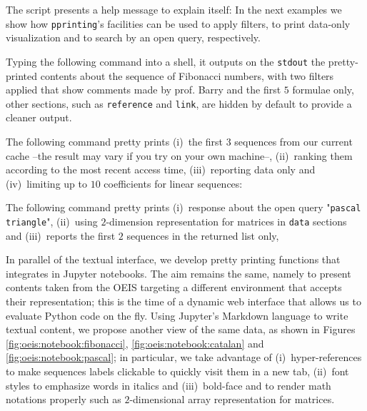 The script presents a help message to explain itself:
 In the next examples
we show how \verb|pprinting|'s facilities can be used to apply filters, to
print data-only visualization and to search by an open query, respectively.

\begin{example} Typing the following command into a shell, it outputs
on the \verb|stdout| the pretty-printed contents about the sequence of
Fibonacci numbers, with two filters applied that show comments made by
prof. Barry and the first $5$ formulae only,
other sections, such as \verb|reference| and \verb|link|, are hidden by
default to provide a cleaner output.
\end{example}

\begin{example}
The following command pretty prints (i)~the first 3 sequences from our current
cache --the result may vary if you try on your own machine--, (ii)~ranking them
according to the most recent access time, (iii)~reporting data only and
(iv)~limiting up to $10$ coefficients for linear sequences:
\end{example}

\begin{example}
The following command pretty prints (i)~response about the open query
"\verb|pascal triangle|", (ii)~using $2$-dimension representation for matrices
in \verb|data| sections and (iii)~reports the first $2$ sequences in the
returned list only,
\end{example}

In parallel of the textual interface, we develop pretty printing functions that
integrates in Jupyter notebooks. The aim remains the same, namely to present
contents taken from the OEIS targeting a different environment that accepts
their representation; this is the time of a dynamic web interface that allows
us to evaluate Python code on the fly. Using Jupyter's Markdown language to
write textual content, we propose another view of the same data, as shown in
Figures \ref{fig:oeis:notebook:fibonacci}, \ref{fig:oeis:notebook:catalan} and
\ref{fig:oeis:notebook:pascal}; in particular, we take advantage of
(i)~hyper-references to make sequences labels clickable to quickly visit them
in a new tab, (ii)~font styles to emphasize words in italics and
(iii)~bold-face and to render math notations properly such as $2$-dimensional
array representation for matrices.
\vfill

